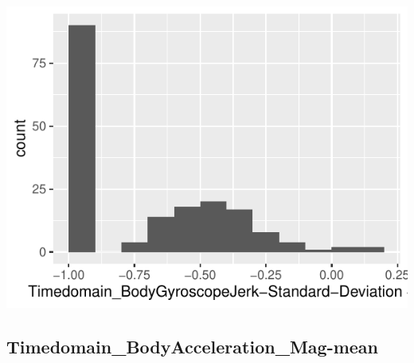 \documentclass[
]{article}
\begin{document}
\begin{minipage}{0.25 \textwidth}

\includegraphics{codebook_tidydatasub_files/figure-latex/Var-32-Timedomain-BodyGyroscopeJerk-Standard-Deviation--Z-1.pdf}

\end{minipage}

\noindent\makebox[\linewidth]{\rule{\textwidth}{0.4pt}}

\hypertarget{timedomain_bodyacceleration_mag-mean}{%
\subsection{Timedomain\_BodyAcceleration\_Mag-mean}\label{timedomain_bodyacceleration_mag-mean}}
\end{document}
